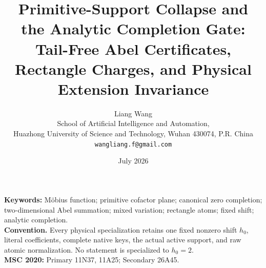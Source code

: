 \documentclass[11pt]{article}
\title{Primitive-Support Collapse and the Analytic Completion Gate:\\
Tail-Free Abel Certificates, Rectangle Charges, and Physical Extension Invariance}
\author{Liang Wang\\
School of Artificial Intelligence and Automation,\\
Huazhong University of Science and Technology, Wuhan 430074, P.R. China\\
\texttt{wangliang.f@gmail.com}}
\date{July 2026}
\theoremstyle{remark}
\begin{document}
\maketitle


\noindent\textbf{Keywords:} M\"obius function; primitive cofactor plane;
canonical zero completion; two-dimensional Abel summation; mixed variation;
rectangle atoms; fixed shift; analytic completion.\\[0.5em]
\noindent\textbf{Convention.} Every physical specialization retains one fixed
nonzero shift \(h_0\), literal coefficients, complete native keys, the actual
active support, and raw atomic normalization.  No statement is specialized
to \(h_0=2\).\\[0.5em]
\noindent\textbf{MSC 2020:} Primary 11N37, 11A25; Secondary 26A45.












\begingroup
\small
\raggedright


\endgroup
\end{document}

